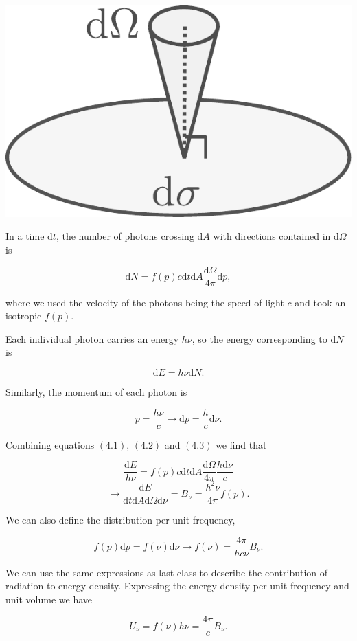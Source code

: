 \documentclass[twocolumn]{article}
\begin{document}
\includegraphics{../assets/5_radiative/intensity.pdf}

In a time \(\mathrm{d}t\), the number of photons crossing
\(\mathrm{d}A\) with directions contained in \(\mathrm{d}\Omega\) is

\[\mathrm{d}N=f(p)c\mathrm{d}t\mathrm{d}A\frac{\mathrm{d}\Omega}{4\pi}\mathrm{d}p,\tag{4.1}\]

where we used the velocity of the photons being the speed of light \(c\)
and took an isotropic \(f(p)\).

Each individual photon carries an energy \(h\nu\), so the energy
corresponding to \(\mathrm{d}N\) is

\[\mathrm{d}E=h\nu \mathrm{d}N.\tag{4.2}\]

Similarly, the momentum of each photon is

\[p=\frac{h\nu}{c}\rightarrow \mathrm{d}p=\frac{h}{c}\mathrm{d}\nu.\tag{4.3}\]

Combining equations \((4.1)\), \((4.2)\) and \((4.3)\) we find that

\[\frac{\mathrm{d}E}{h\nu}=f(p)c\mathrm{d}t\mathrm{d}A\frac{\mathrm{d}\Omega}{4\pi}\frac{h\mathrm{d}\nu}{c}\]
\[\rightarrow \frac{\mathrm{d}E}{\mathrm{d}t\mathrm{d}A\mathrm{d}\Omega\mathrm{d}\nu}=B_\nu = \frac{h^2 \nu}{4\pi}f(p).\]

We can also define the distribution per unit frequency,

\[f(p)\mathrm{d}p=f(\nu)\mathrm{d}\nu \rightarrow \boxed{f(\nu)=\frac{4\pi}{hc\nu}B_\nu.}\tag{4.4}\]

We can use the same expressions as last class to describe the
contribution of radiation to energy density. Expressing the energy
density per unit frequency and unit volume we have

\[U_\nu = f(\nu)h\nu = \frac{4\pi}{c}B_\nu.\]
\end{document}
